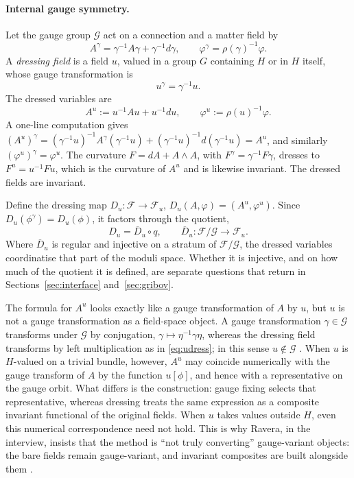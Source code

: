 \documentclass[11pt]{article}
\theoremstyle{plain}
\theoremstyle{definition}
\theoremstyle{remark}
\newcommand{\F}{\mathcal F}
\newcommand{\G}{\mathcal G}
\begin{document}
\paragraph{Internal gauge symmetry.} Let the gauge group $\G$ act on a connection and a matter field by
\begin{equation}
A^\gamma=\gamma^{-1}A\gamma+\gamma^{-1}d\gamma,\qquad \varphi^\gamma=\rho(\gamma)^{-1}\varphi.
\end{equation}
A \emph{dressing field} is a field $u$, valued in a group $G$ containing $H$ or in $H$ itself, whose gauge transformation is
\begin{equation}\label{eq:udress}
u^\gamma=\gamma^{-1}u .
\end{equation}
The dressed variables are
\begin{equation}\label{eq:dressed}
A^u := u^{-1}Au+u^{-1}du,\qquad \varphi^u := \rho(u)^{-1}\varphi .
\end{equation}
A one-line computation gives $(A^u)^\gamma = (\gamma^{-1}u)^{-1}A^\gamma(\gamma^{-1}u)+(\gamma^{-1}u)^{-1}d(\gamma^{-1}u)=A^u$, and similarly $(\varphi^u)^\gamma=\varphi^u$. The curvature $F=dA+A\wedge A$, with $F^\gamma=\gamma^{-1}F\gamma$, dresses to $F^u=u^{-1}Fu$, which is the curvature of $A^u$ and is likewise invariant. The dressed fields are invariant.

Define the dressing map $D_u:\F\to\F_u$, $D_u(A,\varphi)=(A^u,\varphi^u)$. Since $D_u(\phi^\gamma)=D_u(\phi)$, it factors through the quotient,
\begin{equation}\label{eq:Dfactor}
D_u=\overline D_u\circ q,\qquad \overline D_u:\F/\G\to\F_u .
\end{equation}
Where $\overline D_u$ is regular and injective on a stratum of $\F/\G$, the dressed variables coordinatise that part of the moduli space. Whether it is injective, and on how much of the quotient it is defined, are separate questions that return in Sections~\ref{sec:interface} and~\ref{sec:gribov}.

The formula for $A^u$ looks exactly like a gauge transformation of $A$ by $u$, but $u$ is not a gauge transformation as a field-space object. A gauge transformation $\gamma\in\G$ transforms under $\G$ by conjugation, $\gamma\mapsto\eta^{-1}\gamma\eta$, whereas the dressing field transforms by left multiplication as in \eqref{eq:udress}; in this sense $u\notin\G$ \cite{ffl2014,ravera-notes}. When $u$ is $H$-valued on a trivial bundle, however, $A^u$ may coincide numerically with the gauge transform of $A$ by the function $u[\phi]$, and hence with a representative on the gauge orbit. What differs is the construction: gauge fixing selects that representative, whereas dressing treats the same expression as a composite invariant functional of the original fields. When $u$ takes values outside $H$, even this numerical correspondence need not hold. This is why Ravera, in the interview, insists that the method is ``not truly converting'' gauge-variant objects: the bare fields remain gauge-variant, and invariant composites are built alongside them \cite{toe}.
\end{document}
